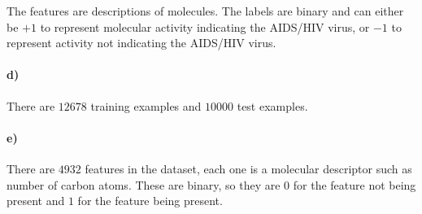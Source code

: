 \documentclass[12pt]{article}
\begin{document}
The features are descriptions of molecules. The labels are binary and can either be \(+1\) to represent molecular
activity indicating the AIDS/HIV virus, or \(-1\) to represent activity not indicating the AIDS/HIV virus.

\paragraph{d)}

There are \(12678\) training examples and \(10000\) test examples.

\paragraph{e)}

There are \(4932\) features in the dataset, each one is a molecular descriptor such as number of carbon atoms.
These are binary, so they are \(0\) for the feature not being present and \(1\) for the feature being present.
\end{document}
